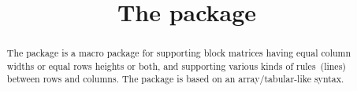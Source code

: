 \documentclass[a4paper,final,11pt]{article}
\title{The package \package{easymat}}
\begin{document}
\maketitle
\begin{abstract}
  The 
  package is a macro package for supporting block matrices
  having equal column widths or equal rows heights or both,
  and supporting various kinds of rules~(lines) between rows and columns.
  The package is based on an array/ta\-bular-like syntax.
\end{abstract}

\tableofcontents
\clearpage

\pagestyle{fpage}
\def\sectionmark#1{\markboth{The package \package{easymat}}{The package \package{easymat}}}
\let\chaptermark\sectionmark
\let\subsectionmark\sectionmark
\end{document}
